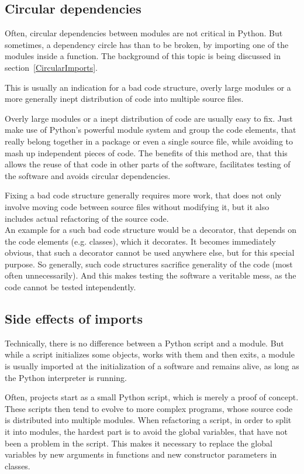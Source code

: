 		\subsection{Circular dependencies}
			Often, circular dependencies between modules are not critical in Python.
			But sometimes, a dependency circle has than to be broken, by importing one of the modules inside a function.
			The background of this topic is being discussed in section~\ref{CircularImports}.

			This is usually an indication for a bad code structure, overly large modules or a more generally inept distribution of code into multiple source files.

			Overly large modules or a inept distribution of code are usually easy to fix.
			Just make use of Python's powerful module system and group the code elements, that really belong together in a package or even a single source file, while avoiding to mash up independent pieces of code.
			The benefits of this method are, that this allows the reuse of that code in other parts of the software, facilitates testing of the software and avoids circular dependencies.

			Fixing a bad code structure generally requires more work, that does not only involve moving code between source files without modifying it, but it also includes actual refactoring of the source code.\\
			An example for a such bad code structure would be a decorator, that depends on the code elements (e.g. classes), which it decorates.
			It becomes immediately obvious, that such a decorator cannot be used anywhere else, but for this special purpose.
			So generally, such code structures sacrifice generality of the code (most often unnecessarily).
			And this makes testing the software a veritable mess, as the code cannot be tested intependently.

		\subsection{Side effects of imports}
			Technically, there is no difference between a Python script and a module.
			But while a script initializes some objects, works with them and then exits, a module is usually imported at the initialization of a software and remains alive, as long as the Python interpreter is running.

			Often, projects start as a small Python script, which is merely a proof of concept.
			These scripts then tend to evolve to more complex programs, whose source code is distributed into multiple modules.
			When refactoring a script, in order to split it into modules, the hardest part is to avoid the global variables, that have not been a problem in the script.
			This makes it necessary to replace the global variables by new arguments in functions and new constructor parameters in classes.

